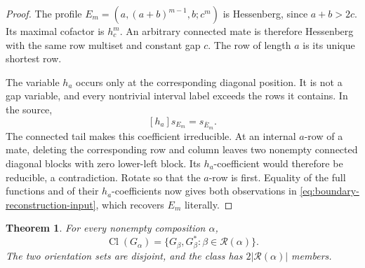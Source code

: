 \documentclass[11pt,a4paper]{amsart}
\numberwithin{equation}{section}
\theoremstyle{plain}
\newtheorem{theorem}{Theorem}[section]
\theoremstyle{definition}
\begin{document}
\begin{proof}
The profile \(E_m=(a,(a+b)^{m-1},b;c^m)\) is Hessenberg, since
\(a+b>2c\).  Its maximal cofactor is \(h_c^m\).
An arbitrary connected mate is therefore Hessenberg with the same row
multiset and constant gap \(c\).  The row of length \(a\) is its
unique shortest row.

The variable \(h_a\) occurs only at the corresponding diagonal
position.  It is not a gap variable, and every nontrivial interval label
exceeds the rows it contains.  In the source,
\begin{equation}\label{eq:short-row-coefficient}
 [h_a]s_{E_m}=s_{\overline E_m}.
\end{equation}
The connected tail makes this coefficient irreducible.  At an internal
\(a\)-row of a mate, deleting the corresponding row and column leaves
two nonempty connected diagonal blocks with zero lower-left block.
Its \(h_a\)-coefficient would therefore be reducible, a contradiction.
Rotate so that the \(a\)-row is first.  Equality of the full functions
and of their \(h_a\)-coefficients now gives both observations in
\eqref{eq:boundary-reconstruction-input}, which recovers \(E_m\)
literally.
\end{proof}

\begin{theorem}\label{thm:two-row-thin-class}
For every nonempty composition \(\alpha\),
\begin{equation}\label{eq:thin-class}
 \operatorname{Cl}(G_\alpha)
 =\{G_\beta,G_\beta^*: \beta\in\mathcal R(\alpha)\}.
\end{equation}
The two orientation sets are disjoint, and the class has
\(2|\mathcal R(\alpha)|\) members.
\end{theorem}
\end{document}

